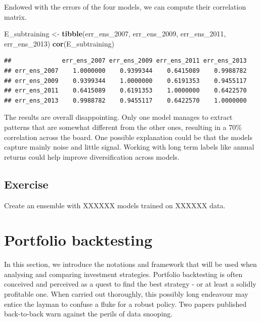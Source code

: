 \documentclass[]{krantz}
\makeatletter
\newenvironment{Shaded}{\begin{snugshade}}{\end{snugshade}}
\newcommand{\DecValTok}[1]{\textcolor[rgb]{0.06,0.06,0.06}{#1}}
\newcommand{\KeywordTok}[1]{\textcolor[rgb]{0.27,0.27,0.27}{\textbf{#1}}}
\newcommand{\NormalTok}[1]{#1}
\newcommand{\StringTok}[1]{\textcolor[rgb]{0.5,0.5,0.5}{#1}}
\newenvironment{kframe}{%
\medskip{}
\setlength{\fboxsep}{.8em}
 \def\at@end@of@kframe{}%
 \ifinner\ifhmode%
  \def\at@end@of@kframe{\end{minipage}}%
  \begin{minipage}{\columnwidth}%
 \fi\fi%
 \def\FrameCommand##1{\hskip\@totalleftmargin \hskip-\fboxsep
 \colorbox{shadecolor}{##1}\hskip-\fboxsep
     \hskip-\linewidth \hskip-\@totalleftmargin \hskip\columnwidth}%
 \MakeFramed {\advance\hsize-\width
   \@totalleftmargin\z@ \linewidth\hsize
   \@setminipage}}%
 {\par\unskip\endMakeFramed%
 \at@end@of@kframe}
\renewenvironment{Shaded}{\begin{kframe}}{\end{kframe}}
\theoremstyle{definition}
\theoremstyle{definition}
\theoremstyle{definition}
\theoremstyle{remark}
\makeatother
\begin{document}
\normalsize

Endowed with the errors of the four models, we can compute their
correlation matrix.

\footnotesize

\begin{Shaded}
\begin{Highlighting}[]
\NormalTok{E_subtraining <-}\StringTok{ }\KeywordTok{tibble}\NormalTok{(err_ens_}\DecValTok{2007}\NormalTok{,}
\NormalTok{                        err_ens_}\DecValTok{2009}\NormalTok{,}
\NormalTok{                        err_ens_}\DecValTok{2011}\NormalTok{,}
\NormalTok{                        err_ens_}\DecValTok{2013}\NormalTok{)}
\KeywordTok{cor}\NormalTok{(E_subtraining)}
\end{Highlighting}
\end{Shaded}

\begin{verbatim}
##              err_ens_2007 err_ens_2009 err_ens_2011 err_ens_2013
## err_ens_2007    1.0000000    0.9399344    0.6415089    0.9988782
## err_ens_2009    0.9399344    1.0000000    0.6191353    0.9455117
## err_ens_2011    0.6415089    0.6191353    1.0000000    0.6422570
## err_ens_2013    0.9988782    0.9455117    0.6422570    1.0000000
\end{verbatim}

\normalsize

The results are overall disappointing. Only one model manages to extract
patterns that are somewhat different from the other ones, resulting in a
70\% correlation across the board. One possible explanation could be
that the models capture mainly noise and little signal. Working with
long term labels like annual returns could help improve diversification
across models.

\hypertarget{exercise}{%
\section{Exercise}\label{exercise}}

Create an ensemble with XXXXXX models trained on XXXXXX data.

\hypertarget{backtest}{%
\chapter{Portfolio backtesting}\label{backtest}}

In this section, we introduce the notations and framework that will be
used when analysing and comparing investment strategies. Portfolio
backtesting is often conceived and perceived as a quest to find the best
strategy - or at least a solidly profitable one. When carried out
thoroughly, this possibly long endeavour may entice the layman to
confuse a fluke for a robust policy. Two papers published back-to-back
warn against the perils of data snooping.
\end{document}
